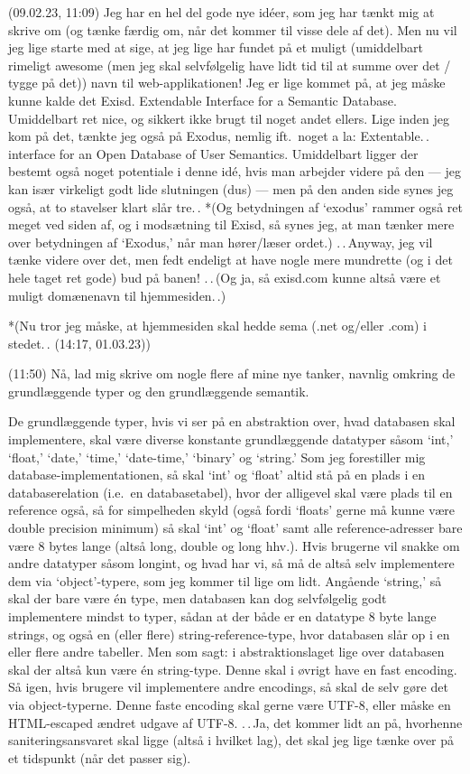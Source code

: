 \documentclass{report}
\begin{document}
(09.02.23, 11:09) Jeg har en hel del gode nye idéer, som jeg har tænkt mig at skrive om (og tænke færdig om, når det kommer til visse dele af det). Men nu vil jeg lige starte med at sige, at jeg lige har fundet på et muligt (umiddelbart rimeligt awesome (men jeg skal selvfølgelig have lidt tid til at summe over det / tygge på det)) navn til web-applikationen! Jeg er lige kommet på, at jeg måske kunne kalde det Exisd. Extendable Interface for a Semantic Database. Umiddelbart ret nice, og sikkert ikke brugt til noget andet ellers. Lige inden jeg kom på det, tænkte jeg også på Exodus, nemlig ift.\ noget a la: Extentable.\,. interface for an Open Database of User Semantics. Umiddelbart ligger der bestemt også noget potentiale i denne idé, hvis man arbejder videre på den --- jeg kan især virkeligt godt lide slutningen (dus) --- men på den anden side synes jeg også, at to stavelser klart slår tre.\,. *(Og betydningen af `exodus' rammer også ret meget ved siden af, og i modsætning til Exisd, så synes jeg, at man tænker mere over betydningen af `Exodus,' når man hører/læser ordet.) .\,.\,Anyway, jeg vil tænke videre over det, men fedt endeligt at have nogle mere mundrette (og i det hele taget ret gode) bud på banen! .\,.\,(Og ja, så exisd.com kunne altså være et muligt domænenavn til hjemmesiden.\,.)

*(Nu tror jeg måske, at hjemmesiden skal hedde sema (.net og/eller .com) i stedet.\,. (14:17, 01.03.23))

(11:50) Nå, lad mig skrive om nogle flere af mine nye tanker, navnlig omkring de grundlæggende typer og den grundlæggende semantik. 

De grundlæggende typer, hvis vi ser på en abstraktion over, hvad databasen skal implementere, skal være diverse konstante grundlæggende datatyper såsom `int,' `float,' `date,' `time,' `date-time,' `binary' og `string.' Som jeg forestiller mig database-implementationen, så skal `int' og `float' altid stå på en plads i en databaserelation (i.e.\ en databasetabel), hvor der alligevel skal være plads til en reference også, så for simpelheden skyld (også fordi `floats' gerne må kunne være double precision minimum) så skal `int' og `float' samt alle reference-adresser bare være 8 bytes lange (altså long, double og long hhv.). Hvis brugerne vil snakke om andre datatyper såsom longint, og hvad har vi, så må de altså selv implementere dem via `object'-typere, som jeg kommer til lige om lidt. Angående `string,' så skal der bare være én type, men databasen kan dog selvfølgelig godt implementere mindst to typer, sådan at der både er en datatype 8 byte lange strings, og også en (eller flere) string-reference-type, hvor databasen slår op i en eller flere andre tabeller. Men som sagt: i abstraktionslaget lige over databasen skal der altså kun være én string-type. Denne skal i øvrigt have en fast encoding. Så igen, hvis brugere vil implementere andre encodings, så skal de selv gøre det via object-typerne. Denne faste encoding skal gerne være UTF-8, eller måske en HTML-escaped ændret udgave af UTF-8. .\,.\,Ja, det kommer lidt an på, hvorhenne saniteringsansvaret skal ligge (altså i hvilket lag), det skal jeg lige tænke over på et tidspunkt (når det passer sig). 
\end{document}
